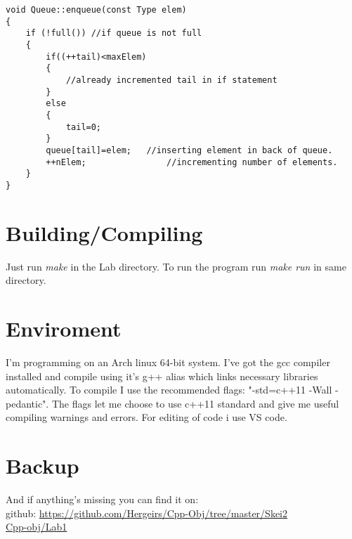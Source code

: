 \documentclass[11pt]{article}
\begin{document}
\begin{lstlisting}
void Queue::enqueue(const Type elem)
{		
	if (!full()) //if queue is not full
	{
		if((++tail)<maxElem)
		{
			//already incremented tail in if statement
		}
		else
		{
			tail=0;
		}
		queue[tail]=elem;	//inserting element in back of queue.
		++nElem;				//incrementing number of elements.
	}
}
\end{lstlisting}

\section{Building/Compiling}
Just run \emph{make} in the Lab directory.
To run the program run \emph{make run} in same directory.

\section{Enviroment}
I'm programming on an Arch linux 64-bit system. I've got the gcc compiler installed and compile using it's g++ alias which links necessary libraries automatically. To compile I use the recommended flags: "-std=c++11 -Wall -pedantic". The flags let me choose to use c++11 standard and give me useful compiling warnings and errors. 
For editing of code i use VS code.

\section{Backup}
And if anything's missing you can find it on: \\
github: \url{https://github.com/Hergeirs/Cpp-Obj/tree/master/Skei2} \\
\href{https://github.com/Hergeirs/Cpp-Obj/tree/master/Skei2}{Cpp-obj/Lab1}



\flushright{\today}
\end{document}
